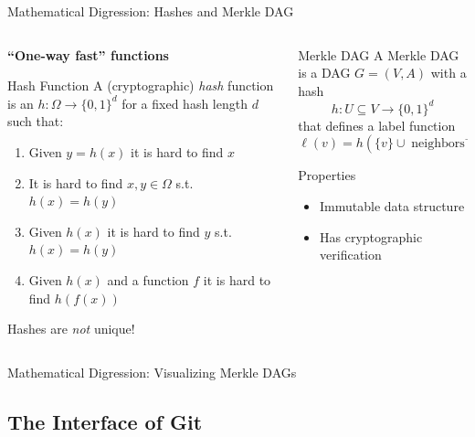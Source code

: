 \documentclass[xetex, handout]{beamer}
\begin{document}
\begin{frame}{Mathematical Digression: Hashes and Merkle DAG}
  \begin{columns}
    \begin{column}{.5\linewidth}
      \textbf{``One-way fast'' functions}
      \begin{block}{Hash Function}
        A (cryptographic) \emph{hash} function is an $h : \Omega \to \{0,1\}^d$
        for a fixed hash length $d$ such that:
        \begin{enumerate}
          \item Given $y = h(x)$ it is hard to find $x$
          \item It is hard to find $x,y \in \Omega$ s.t. $h(x) = h(y)$
	  \item Given $h(x)$ it is hard to find $y$ s.t. $h(x) = h(y)$
          \item Given $h(x)$ and a function $f$ it is hard to find $h(f(x))$
        \end{enumerate}
      \end{block}
      Hashes are \emph{not} unique!
    \end{column}
    \begin{column}{.5\linewidth}
      \begin{block}{Merkle DAG}
        A Merkle DAG is a DAG $G = (V,A)$ with a hash
        \[
          h : U \subseteq V \to \{0,1\}^d
        \]
        that defines a label function
        \[
          \ell(v) = h(\{v\} \cup \operatorname{neighbors}^+(v))
        \]
      \end{block}
      \begin{alertblock}{Properties}
        \begin{itemize}
          \item Immutable data structure
          \item Has cryptographic verification
        \end{itemize}
      \end{alertblock}
    \end{column}
  \end{columns}
\end{frame}

\begin{frame}[fragile]{Mathematical Digression: Visualizing Merkle DAGs}
\end{frame}

\subsection{The Interface of Git}
\end{document}
